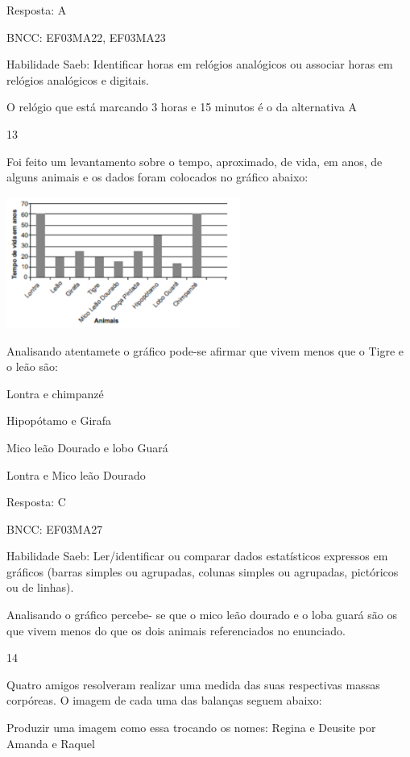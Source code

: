 \begin{escolha}
\begin{escolha}
Resposta: A

BNCC: EF03MA22, EF03MA23

Habilidade Saeb: Identificar horas em relógios analógicos ou associar
horas em relógios analógicos e digitais.

O relógio que está marcando 3 horas e 15 minutos é o da alternativa A

\num{13}

Foi feito um levantamento sobre o tempo, aproximado, de vida, em anos,
de alguns animais e os dados foram colocados no gráfico abaixo:

\includegraphics[width=3.02451in,height=1.70004in]{media/image127.png}

Analisando atentamete o gráfico pode-se afirmar que vivem menos que o
Tigre e o leão são:

\begin{escolha}

\item
  Lontra e chimpanzé
\item
  Hipopótamo e Girafa
\item
  Mico leão Dourado e lobo Guará
\item
  Lontra e Mico leão Dourado
\end{escolha}

Resposta: C

BNCC: EF03MA27

Habilidade Saeb: Ler/identificar ou comparar dados estatísticos
expressos em gráficos (barras simples ou agrupadas, colunas simples ou
agrupadas, pictóricos ou de linhas).

Analisando o gráfico percebe- se que o mico leão dourado e o loba guará
são os que vivem menos do que os dois animais referenciados no
enunciado.

\num{14}

Quatro amigos resolveram realizar uma medida das suas respectivas massas
corpóreas. O imagem de cada uma das balanças seguem abaixo:

Produzir uma imagem como essa trocando os nomes: Regina e Deusite por
Amanda e Raquel


\end{escolha}
\end{escolha}
